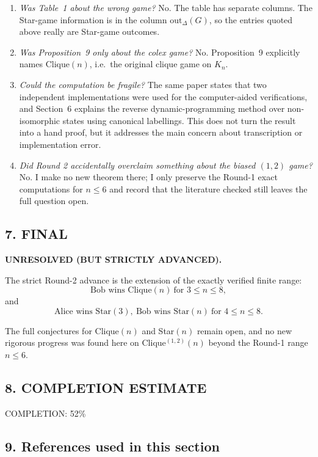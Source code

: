 \begin{enumerate}
\item \emph{Was Table~1 about the wrong game?}  
No. The table has separate columns. The Star-game information is in the column $\mathrm{out}_{\Delta}(G)$, so the entries quoted above really are Star-game outcomes.

\item \emph{Was Proposition~9 only about the colex game?}  
No. Proposition~9 explicitly names Clique$(n)$, i.e.\ the original clique game on $K_n$.

\item \emph{Could the computation be fragile?}  
The same paper states that two independent implementations were used for the computer-aided verifications, and Section~6 explains the reverse dynamic-programming method over non-isomorphic states using canonical labellings. This does not turn the result into a hand proof, but it addresses the main concern about transcription or implementation error.

\item \emph{Did Round 2 accidentally overclaim something about the biased $(1,2)$ game?}  
No. I make no new theorem there; I only preserve the Round-1 exact computations for $n \leq 6$ and record that the literature checked still leaves the full question open.
\end{enumerate}

\subsection*{7. FINAL}

\textbf{UNRESOLVED (BUT STRICTLY ADVANCED).}

The strict Round-2 advance is the extension of the exactly verified finite range:
\[
\mbox{Bob wins Clique}(n)\ \mbox{for } 3 \leq n \leq 8,
\]
and
\[
\mbox{Alice wins Star}(3),\ \mbox{Bob wins Star}(n)\ \mbox{for } 4 \leq n \leq 8.
\]

The full conjectures for Clique$(n)$ and Star$(n)$ remain open, and no new rigorous progress was found here on Clique$^{(1,2)}(n)$ beyond the Round-1 range $n \leq 6$.

\subsection*{8. COMPLETION ESTIMATE}

COMPLETION: 52\%

\subsection*{9. References used in this section}

